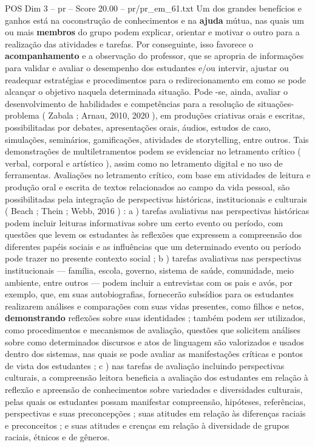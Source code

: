 \begin{textsample}{POS Dim 3 – pr – Score 20.00 – pr/pr\_em\_61.txt}
Um dos grandes benefícios e ganhos está na coconstrução de conhecimentos e na \textbf{ajuda} mútua, nas quais um ou mais \textbf{membros} do grupo podem explicar, orientar e motivar o outro para a realização das atividades e tarefas.
Por conseguinte, isso favorece o \textbf{acompanhamento} e a observação do professor, que se apropria de informações para validar e avaliar o desempenho dos estudantes e/ou intervir, ajustar ou readequar estratégias e procedimentos para o redirecionamento em como se pode alcançar o objetivo naquela determinada situação.
Pode -se, ainda, avaliar o desenvolvimento de habilidades e competências para a resolução de situações-problema ( Zabala ; Arnau, 2010, 2020 ), em produções criativas orais e escritas, possibilitadas por debates, apresentações orais, áudios, estudos de caso, simulações, seminários, gamificações, atividades de storytelling, entre outros.
Tais demonstrações de multiletramentos podem se evidenciar no letramento crítico ( verbal, corporal e artístico ), assim como no letramento digital e no uso de ferramentas.
Avaliações no letramento crítico, com base em atividades de leitura e produção oral e escrita de textos relacionados ao campo da vida pessoal, são possibilitadas pela integração de perspectivas históricas, institucionais e culturais ( Beach ; Thein ; Webb, 2016 ) : a ) tarefas avaliativas nas perspectivas históricas podem incluir leituras informativas sobre um certo evento ou período, com questões que levem os estudantes às reflexões que expressem a compreensão dos diferentes papéis sociais e as influências que um determinado evento ou período pode trazer no presente contexto social ; b ) tarefas avaliativas nas perspectivas institucionais — família, escola, governo, sistema de saúde, comunidade, meio ambiente, entre outros — podem incluir a entrevistas com os pais e avós, por exemplo, que, em suas autobiografias, fornecerão subsídios para os estudantes realizarem análises e comparações com suas vidas presentes, como filhos e netos, \textbf{demonstrando} reflexões sobre suas identidades ; também podem ser utilizados, como procedimentos e mecanismos de avaliação, questões que solicitem análises sobre como determinados discursos e atos de linguagem são valorizados e usados dentro dos sistemas, nas quais se pode avaliar as manifestações críticas e pontos de vista dos estudantes ; c ) nas tarefas de avaliação incluindo perspectivas culturais, a compreensão leitora beneficia a avaliação dos estudantes em relação à reflexão e apreensão de conhecimentos sobre variedades e diversidades culturais, pelas quais os estudantes possam manifestar compreensão, hipóteses, referências, perspectivas e suas preconcepções ; suas atitudes em relação às diferenças raciais e preconceitos ; e suas atitudes e crenças em relação à diversidade de grupos raciais, étnicos e de gêneros.

\end{textsample}
